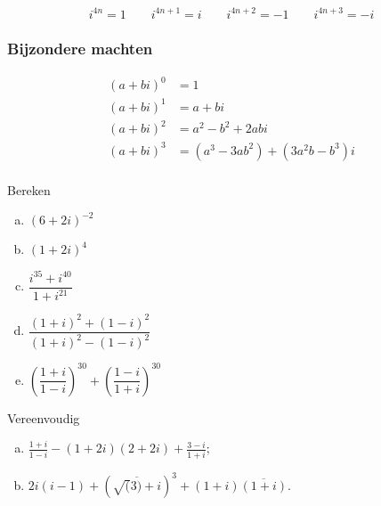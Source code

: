 \documentclass[12pt,twoside,a4]{article}
\begin{document}
\begin{center}
\end{center}

$$i^{4n}=1 \qquad i^{4n+1}=i \qquad i^{4n+2}=-1 \qquad i^{4n+3}=-i$$

\subsubsection*{Bijzondere machten}
\begin{align*}
  (a+bi)^0 &= 1\\
  (a+bi)^1 &= a+bi\\
  (a+bi)^2 &= a^2-b^2 + 2abi\\
  (a+bi)^3 &= (a^3 - 3ab^2) + (3a^2b -b^3)i\\
\end{align*}


\begin{oefening}
  Bereken
  \begin{enumerate}[(a)]
    \itemsep1em
  \item $\displaystyle \left(6+2i\right)^{-2}$
  \item $\displaystyle \left(1+2i\right)^4$
  \item $\displaystyle \dfrac{i^{35}+i^{40}}{1+i^{21}}$
  \item $\displaystyle \dfrac{(1+i)^2+(1-i)^2}{(1+i)^2-(1-i)^2}$
  \item $\displaystyle \left(\dfrac{1+i}{1-i}\right)^{30}+\left(\dfrac{1-i}{1+i}\right)^{30}$
  \end{enumerate}
\end{oefening}

\begin{oefening}
  Vereenvoudig
  \begin{enumerate}[(a)]
    \itemsep 1em
  \item $\frac{1+i}{1-i}-(1+2i)(2+2i)+\frac{3-i}{1+i}$;
  \item $2i(i-1)+\left(\overline{\sqrt(3)+i}\right)^3+(1+i)\overline{(1+i)}.$
  \end{enumerate}
\end{oefening}
\end{document}
